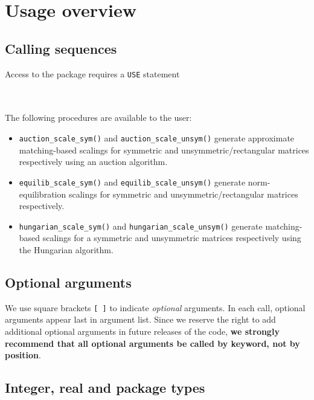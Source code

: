 
\section{Usage overview}

\subsection{Calling sequences}

Access to the package requires a {\tt USE} statement \\ \\
\indent\hspace{8mm}{\tt use spral\_scaling} \\

\medskip

\newpage
\noindent
The following procedures are available to the user:
\begin{itemize}
\item \texttt{auction\_scale\_sym()} and \texttt{auction\_scale\_unsym()} generate approximate matching-based scalings for symmetric and unsymmetric/rectangular matrices respectively using an auction algorithm.
\item \texttt{equilib\_scale\_sym()} and \texttt{equilib\_scale\_unsym()} generate norm-equilibration scalings for symmetric and unsymmetric/rectangular matrices respectively.
\item \texttt{hungarian\_scale\_sym()} and \texttt{hungarian\_scale\_unsym()} generate matching-based scalings for a symmetric and unsymmetric matrices respectively using the Hungarian algorithm.
\end{itemize}

\subsection{Optional arguments}\label{Optional arguments}

We use square brackets {\tt [ ]} to indicate {\it optional} arguments.
In each
call, optional arguments appear last in argument list.  Since we
reserve the right to add additional optional arguments in future
releases of the code, {\bf we strongly recommend that all optional
arguments be called by keyword, not by position}.

\subsection{Integer, real and package types}\label{Integer kinds}

